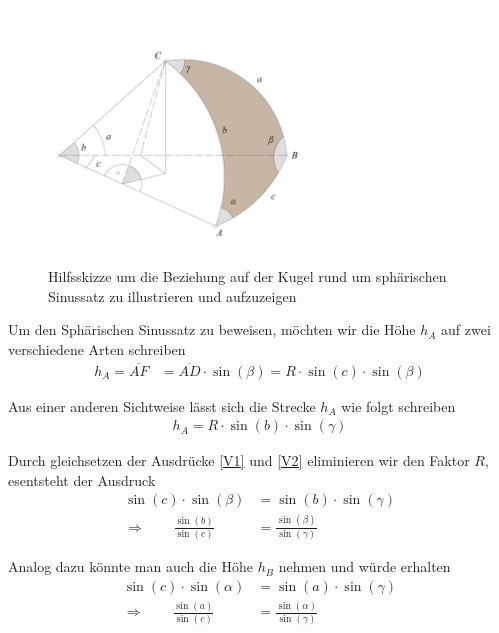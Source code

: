 \begin{refsection}
\begin{figure}[hbtp]
\centering
\includegraphics[width=0.6\textwidth]{kugel/Sinussatz.jpg}
\caption{Hilfsskizze um die Beziehung auf der Kugel rund um sphärischen Sinussatz zu illustrieren und aufzuzeigen}
\end{figure}

Um den Sphärischen Sinussatz zu beweisen, möchten wir die Höhe $h_{A}$ auf zwei verschiedene Arten schreiben
\begin{align}
h_{A} = \overline{AF} &= \overline{AD} \cdot \sin(\beta) = R \cdot \sin(c) \cdot \sin(\beta)  
\label {V1}
\end{align}

Aus einer anderen Sichtweise lässt sich die Strecke $h_{A}$ wie folgt schreiben
\begin{align}
h_{A} = R \cdot \sin(b) \cdot \sin(\gamma)  
\label {V2}
\end{align}

Durch gleichsetzen der Ausdrücke \eqref{V1} und \eqref{V2} eliminieren wir den Faktor $R$, esentsteht der Ausdruck
\begin{align*}
\sin(c) \cdot \sin(\beta) &= \sin(b) \cdot \sin(\gamma) \\
\Rightarrow \quad \quad
\frac{\sin (b)}{\sin (c)} &= \frac{\sin (\beta)}{\sin (\gamma)}
\end{align*}

Analog dazu könnte man auch die Höhe $h_{B}$ nehmen und würde erhalten
\begin{align*}
\sin(c) \cdot \sin(\alpha) &= \sin(a) \cdot \sin(\gamma) \\
\Rightarrow \quad \quad
\frac{\sin (a)}{\sin (c)} &= \frac{\sin (\alpha)}{\sin (\gamma)}
\end{align*}


\end{refsection}
